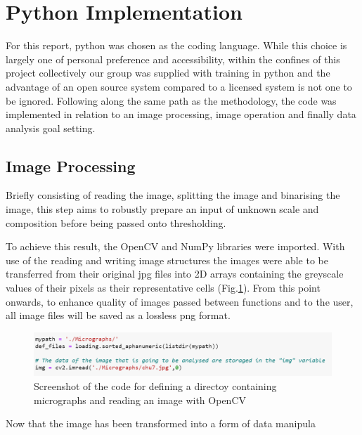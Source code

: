 \section{Python Implementation}

For this report, python was chosen as the coding language. While this choice is largely one of personal preference and accessibility, within the confines of this project collectively our group was supplied with training in python and the advantage of an open source system compared to a licensed system is not one to be ignored. Following along the same path as the methodology, the code was implemented in relation to an image processing, image operation and finally data analysis goal setting.

\subsection{Image Processing}
Briefly consisting of reading the image, splitting the image and binarising the image, this step aims to robustly prepare an input of unknown scale and composition before being passed onto thresholding.

\noindent
To achieve this result, the OpenCV and NumPy libraries were imported. With use of the reading and writing image structures the images were able to be transferred from their original jpg files into 2D arrays containing the greyscale values of their pixels as their representative cells (Fig.\ref{fig:ReadingCode}). From this point onwards, to enhance quality of images passed between functions and to the user, all image files will be saved as a lossless png format.

\begin{figure}[h] %
    \centering
    \includegraphics[width=6in]{Figures/Code/Reading an image.png}
    \caption{Screenshot of the code for defining a directoy containing micrographs and reading an image with OpenCV}
    \label{fig:ReadingCode}
\end{figure}


\noindent
Now that the image has been transformed into a form of data manipula